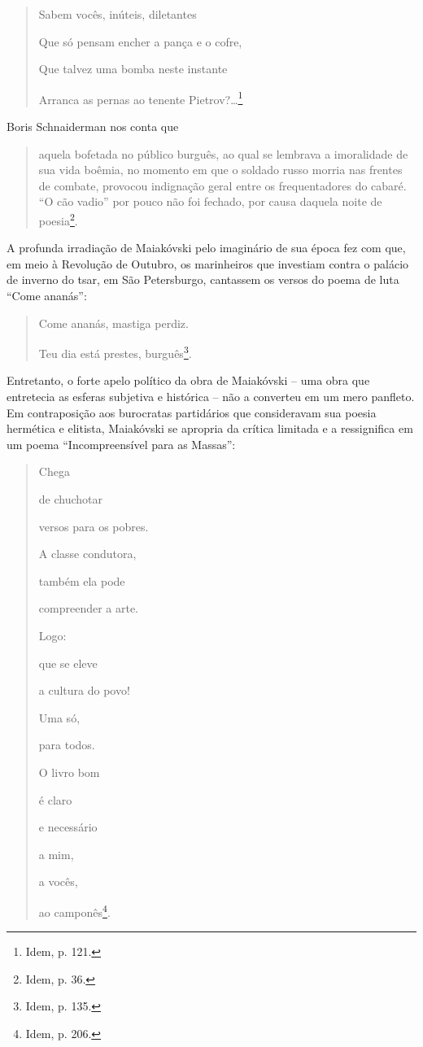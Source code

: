 \begin{quote}
Sabem vocês, inúteis, diletantes

Que só pensam encher a pança e o cofre,

Que talvez uma bomba neste instante

Arranca as pernas ao tenente Pietrov?\ldots{}\footnote{Idem, p. 121.}
\end{quote}

Boris Schnaiderman nos conta que

\begin{quote}
aquela bofetada no público burguês, ao qual se lembrava a imoralidade de
sua vida boêmia, no momento em que o soldado russo morria nas frentes de
combate, provocou indignação geral entre os frequentadores do cabaré.
``O cão vadio'' por pouco não foi fechado, por causa daquela noite de
poesia\footnote{Idem, p. 36.}.
\end{quote}

A profunda irradiação de Maiakóvski pelo imaginário de sua época fez com
que, em meio à Revolução de Outubro, os marinheiros que investiam contra
o palácio de inverno do tsar, em São Petersburgo, cantassem os versos do
poema de luta ``Come ananás'':

\begin{quote}
Come ananás, mastiga perdiz.

Teu dia está prestes, burguês\footnote{Idem, p. 135.}.
\end{quote}

Entretanto, o forte apelo político da obra de Maiakóvski -- uma obra que
entretecia as esferas subjetiva e histórica -- não a converteu em um
mero panfleto. Em contraposição aos burocratas partidários que
consideravam sua poesia hermética e elitista, Maiakóvski se apropria da
crítica limitada e a ressignifica em um poema ``Incompreensível para as
Massas'':

\begin{quote}
Chega

de chuchotar

versos para os pobres.

A classe condutora,

também ela pode

compreender a arte.

Logo:

que se eleve

a cultura do povo!

Uma só,

para todos.

O livro bom

é claro

e necessário

a mim,

a vocês,

ao camponês\footnote{Idem, p. 206.}.
\end{quote}

